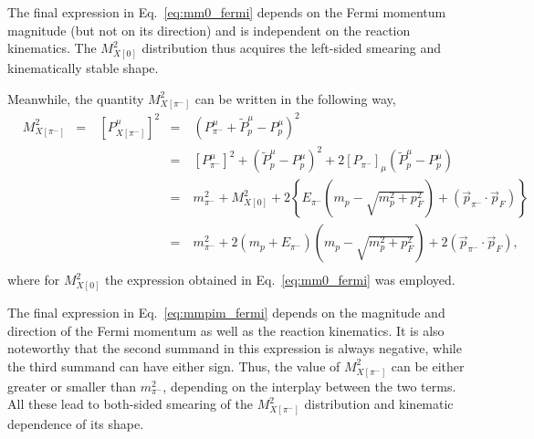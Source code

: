 The final expression in Eq.~\eqref{eq:mm0_fermi} depends on the Fermi momentum magnitude (but not on its direction) and is independent on the reaction kinematics. The $M_{X[0]}^{2}$ distribution thus acquires the left-sided smearing and kinematically stable shape.



Meanwhile, the quantity $M_{X[\pi^{-}]}^{2}$ can be written in the following way,
\begin{equation}
\begin{aligned}
&M_{X[\pi^{-}]}^{2}&=&~\left [P_{X[\pi^{-}]}^{\mu} \right ]^{2}&=&~\left (P_{\pi^{-}}^{\mu}+ \widetilde{P}^{\mu}_{p} - P^{\mu}_{p} \right )^{2}\\
&&&& =&~\left [P^{\mu}_{\pi^{-}} \right ]^{2} + \left (  \widetilde{P}^{\mu}_{p} - P^{\mu}_{p} \right )^{2}+2[P_{\pi^{-}}]_{\mu} \left ( \widetilde{P}^{\mu}_{p}  -  P^{\mu}_{p}  \right )\\
&&&&=&~m_{\pi^{-}}^{2} + M_{X[0]}^{2} +2\left \{ E_{\pi^{-}}\left (m_{p}-\sqrt{m_{p}^{2}+p_{F}^{2}}\right ) + (\overrightarrow{p}_{\pi^{-}} \cdot \overrightarrow{p}_{F}) \right \}\\
&&&&=&~m_{\pi^{-}}^{2} + 2\left (m_{p}+E_{\pi^{-}}\right )\left (m_{p}-\sqrt{m_{p}^{2}+p_{F}^{2}}\right ) +2\left (\overrightarrow{p}_{\pi^{-}} \cdot \overrightarrow{p}_{F} \right ),\\
\end{aligned}\label{eq:mmpim_fermi}
\end{equation}
where for $M_{X[0]}^{2}$ the expression obtained in Eq.~\eqref{eq:mm0_fermi} was employed.

The final expression in Eq.~\eqref{eq:mmpim_fermi} depends on the magnitude and direction of the Fermi momentum as well as the reaction kinematics. It is also noteworthy that the second summand in this expression is always negative, while the third summand can have either sign. Thus, the value of $M_{X[\pi^{-}]}^{2}$ can be either greater or smaller than $m_{\pi^{-}}^{2}$, depending on the interplay between the two terms. All these lead to both-sided smearing of the $M_{X[\pi^{-}]}^{2}$ distribution and kinematic dependence of its shape.


